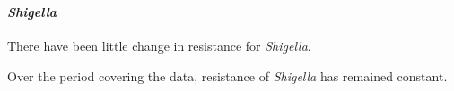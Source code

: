 \documentclass[11pt]{article}
\begin{document}
    \begin{center}
    \end{center}
    { \hspace*{\fill} \\}
    
    \hypertarget{shigella}{%
\paragraph{\texorpdfstring{\emph{Shigella}}{Shigella}}\label{shigella}}

    There have been little change in resistance for \emph{Shigella}.

Over the period covering the data, resistance of \emph{Shigella} has
remained constant.
\end{document}
